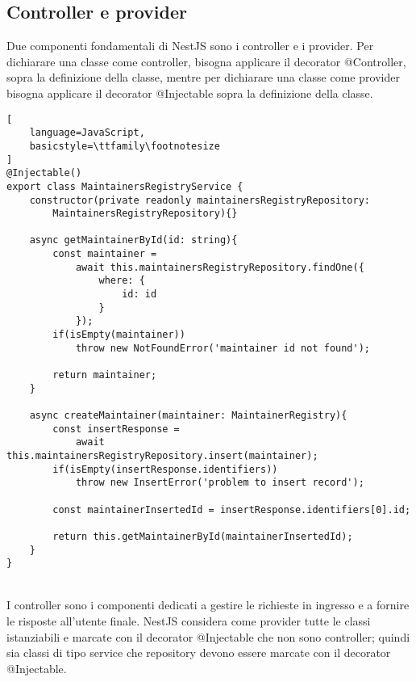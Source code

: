 \subsection{Controller e provider}
Due componenti fondamentali di NestJS sono i controller e i provider. 
Per dichiarare una classe come controller, bisogna applicare il decorator @Controller, sopra la 
definizione della classe, mentre per dichiarare una classe come provider bisogna applicare il decorator
@Injectable sopra la definizione della classe.
\\
\begin{lstlisting}[
    language=JavaScript,
    basicstyle=\ttfamily\footnotesize
]
@Injectable()
export class MaintainersRegistryService {
    constructor(private readonly maintainersRegistryRepository: 
        MaintainersRegistryRepository){}

    async getMaintainerById(id: string){
        const maintainer = 
            await this.maintainersRegistryRepository.findOne({
                where: {
                    id: id
                }
            });
        if(isEmpty(maintainer))
            throw new NotFoundError('maintainer id not found');

        return maintainer;
    }

    async createMaintainer(maintainer: MaintainerRegistry){
        const insertResponse = 
            await this.maintainersRegistryRepository.insert(maintainer);
        if(isEmpty(insertResponse.identifiers))
            throw new InsertError('problem to insert record');

        const maintainerInsertedId = insertResponse.identifiers[0].id;

        return this.getMaintainerById(maintainerInsertedId);
    }
}
\end{lstlisting}
\leavevmode\newline
\\
I controller sono i componenti dedicati a gestire le richieste in ingresso e a fornire le risposte all'utente
finale. NestJS considera come provider tutte le classi istanziabili e marcate con il decorator 
@Injectable che non sono controller; quindi sia classi di tipo service che repository devono essere marcate
con il decorator @Injectable. 
\\
